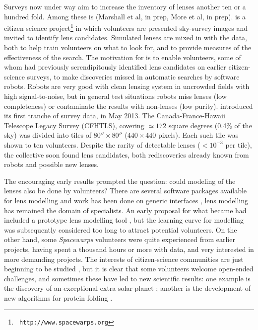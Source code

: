 Surveys now under way aim to increase the inventory of lenses another
ten or a hundred fold.  Among these is \sw (Marshall et al, in prep,
More et al, in prep).  \sw is a citizen science project\footnote{\tt
  http://www.spacewarps.org} in which volunteers are presented
sky-survey images and invited to identify lens candidates.  Simulated
lenses are mixed in with the data, both to help train volunteers on
what to look for, and to provide measures of the effectiveness of the
search.  The motivation for \sw is to enable volunteers, some of whom
had previously serendipitously identified lens candidates on earlier
citizen-science surveys, to make discoveries missed in automatic
searches by software robots.  Robots are very good with clean lensing
system in uncrowded fields with high signal-to-noise, but in general
test situations \citep{2009ApJ...694..924M} robots miss lenses (low
completeness) or contaminate the results with non-lenses (low purity).
\sw introduced its first tranche of survey data, in May 2013.  The
Canada-France-Hawaii Telescope Legacy Survey (CFHTLS), covering
$\simeq172$ square degrees (0.4\% of the sky) was divided into tiles
of $80''\times80''$ ($440\times 440$ pixels).  Each such tile was
shown to ten volunteers.  Despite the rarity of detectable lenses
($<10^{-3}$ per tile), the \sw collective soon found lens candidates,
both rediscoveries already known from robots \citep{Gavazzi2012,
  More2012ApJ} and possible new lenses.

The encouraging early results prompted the question: could modeling of
the lenses also be done by volunteers?  There are several software
packages available for lens modelling \citep[for a review,
  see][]{2013NewAR..57....1L} and work has been done on generic
interfaces \citep{2014A&C.....5...28L}, lens modelling has remained
the domain of specialists.  An early proposal for what became \sw had
included a prototype lens modelling tool \citep{2010AAS...21543527N},
but the learning curve for modelling was subsequently considered too
long to attract potential volunteers.  On the other hand, some {\em
  Spacewarps\/} volunteers were quite experienced from earlier
projects, having spent a thousand hours or more with data, and very
interested in more demanding projects.  The interests of
citizen-science communities are just beginning to be studied
\citep[e.g.,][]{2013AEdRv..12a0106J}, but it is clear that some
volunteers welcome open-ended challenges, and sometimes these have led
to new scientific results: one example is the discovery of an
exceptional extra-solar planet \citep{2013ApJ...768..127S}; another is
the development of new algorithms for protein folding
\citep{Khatib22112011}.

